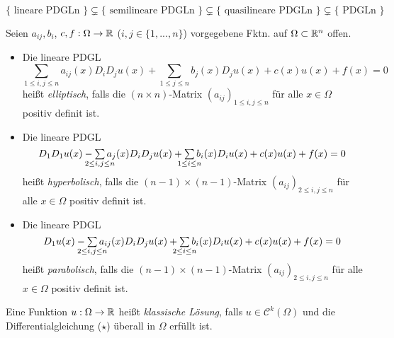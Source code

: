 \documentclass{cheat-sheet}
\begin{document}
\begin{bem}
  $\{\text{ lineare PDGLn }\} \subsetneq \{\text{ semilineare PDGLn }\} \subsetneq \{\text{ quasilineare PDGLn }\} \subsetneq \{\text{ PDGLn }\}$
\end{bem}


\begin{defn}
  Seien $a_{ij}, b_i$, $c, f : \Omega \to \mathbb{R}$ ($i, j \in \{ 1, ..., n \}$) vorgegebene Fktn. auf $\Omega \subset \mathbb{R}^n$ offen.
  \begin{itemize}
    \item Die lineare PDGL
    \[ \sum_{1 \leq i, j \leq n} a_{ij}(x) D_i D_j u(x) + \sum_{1 \leq j \leq n} b_j(x) D_j u(x) + c(x) u(x) + f(x) = 0 \]
    heißt \emph{elliptisch}, falls die $(n \times n)$-Matrix $(a_{ij})_{1 \leq i,j \leq n}$ für alle $x \in \Omega$ positiv definit ist.
    \item Die lineare PDGL
    \[ D_1 D_1 u(x) - \sum_{\mathclap{2 \leq i, j \leq n}} a_{j}(x) D_i D_j u(x) + \sum_{\mathclap{1 \leq i \leq n}} b_i(x) D_i u(x) + c(x) u(x) + f(x) = 0 \]
    heißt \emph{hyperbolisch}, falls die $(n{-}1) \times (n{-}1)$-Matrix $(a_{ij})_{2 \leq i, j \leq n}$ für alle $x \in \Omega$ positiv definit ist.
    \item Die lineare PDGL
    \[ D_1 u(x) - \sum_{\mathclap{2 \leq i, j \leq n}} a_{ij}(x) D_i D_j u(x) + \sum_{\mathclap{2 \leq i \leq n}} b_i(x) D_i u(x) + c(x) u(x) + f(x) = 0 \]
    heißt \emph{parabolisch}, falls die $(n{-}1) \times (n{-}1)$-Matrix $(a_{ij})_{2 \leq i,j \leq n}$ für alle $x \in \Omega$ positiv definit ist.
  \end{itemize}
\end{defn}



\begin{defn}
  Eine Funktion $u : \Omega \to \mathbb{R}$ heißt \emph{klassische Lösung}, falls $u \in \mathcal{C}^k(\Omega)$ und die Differentialgleichung ($\star$) überall in $\Omega$ erfüllt ist.
\end{defn}


\end{document}
